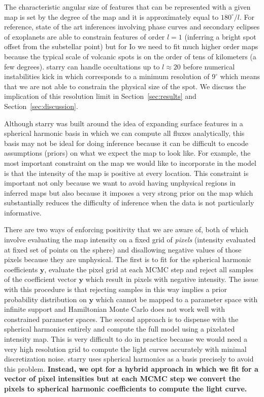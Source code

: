 \documentclass[linenumbers,modern]{aastex62}
\begin{document}
The characteristic angular size of features that can be represented with a given map is set by the degree of the map and it is approximately equal to $180^\circ/l$.
For reference, state of the art inferences involving phase curves and secondary eclipses of exoplanets are able to constrain features of order $l=1$ (inferring a bright spot offset from the substellar point) but for Io we need to fit much higher order maps because the typical scale of volcanic spots is on the order of tens of kilometers (a few degrees).
\textsf{starry} can handle occultations up to $l\approx 20$ before numerical instabilities kick in \citep{luger2019a} which corresponds to a minimum resolution of $9^\circ$ which means that we are not able to constrain the physical size of the spot.
We discuss the implication of this resolution limit in Section~\ref{sec:results} and Section~\ref{sec:discussion}.

Although \textsf{starry} was built around the idea of expanding surface features in a spherical harmonic basis in which we can compute all fluxes analytically, this basis may not be ideal for doing inference because it can be difficult to encode assumptions (priors) on what we expect the map to look like.
For example, the most important constraint on the map we would like to incorporate in the model is that the intensity of the map is positive at every location. 
This constraint is important not only because we want to avoid having unphysical regions in inferred maps but also because it imposes a very strong prior on the map which substantially reduces the difficulty of inference when the data is not particularly informative.

There are two ways of enforcing positivity that we are aware of, both of which involve evaluating the map intensity on a fixed grid of \emph{pixels} (intensity evaluated at fixed set of points on the sphere) and disallowing negative values of those pixels because they are unphysical.
The first is to fit for the spherical harmonic coefficients $\mathbf{y}$, evaluate the pixel grid at each MCMC step and reject all samples of the coefficient vector $\mathbf{y}$ which result in pixels with negative intensity.
The issue with this procedure is that rejecting samples in this way implies a prior probability distribution on $\mathbf{y}$ which cannot be mapped to a parameter space with infinite support and Hamiltonian Monte Carlo does not work well with constrained parameter spaces.
The second approach is to dispense with the spherical harmonics entirely and compute the full model using a pixelated intensity map.
This is very difficult to do in practice because we would need a very high resolution grid to compute the light curves accurately with minimal discretization noise.  
\textsf{starry} uses spherical harmonics as a basis precisely to avoid this problem.
\textbf{Instead, we opt for a hybrid approach in which we fit for a vector of pixel intensities but at each MCMC step we convert the pixels to spherical harmonic coefficients to compute the light curve.}
\end{document}
